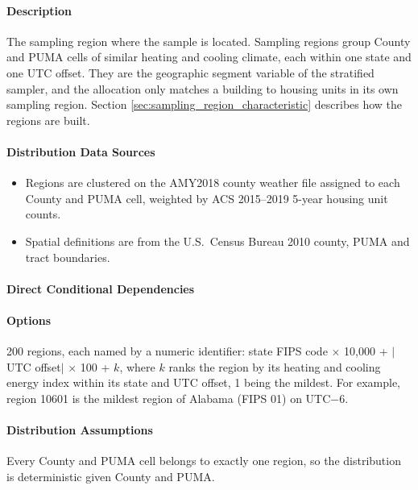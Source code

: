 \paragraph{Description}
% 
The sampling region where the sample is located. Sampling regions group County and PUMA cells of similar heating and cooling climate, each within one state and one UTC offset. They are the geographic segment variable of the stratified sampler, and the allocation only matches a building to housing units in its own sampling region. Section \ref{sec:sampling_region_characteristic} describes how the regions are built.

\paragraph{Distribution Data Sources}
% 
\begin{itemize}
    \item Regions are clustered on the AMY2018 county weather file assigned to each County and PUMA cell, weighted by ACS 2015--2019 5-year housing unit counts.
    \item Spatial definitions are from the U.S.~Census Bureau 2010 county, PUMA and tract boundaries.
\end{itemize}

\paragraph{Direct Conditional Dependencies}


\paragraph{Options}
200 regions, each named by a numeric identifier: state FIPS code $\times$ 10,000 + $|$UTC offset$|$ $\times$ 100 + $k$, where $k$ ranks the region by its heating and cooling energy index within its state and UTC offset, 1 being the mildest. For example, region 10601 is the mildest region of Alabama (FIPS 01) on UTC$-$6.

\paragraph{Distribution Assumptions}
% 
Every County and PUMA cell belongs to exactly one region, so the distribution is deterministic given County and PUMA.
